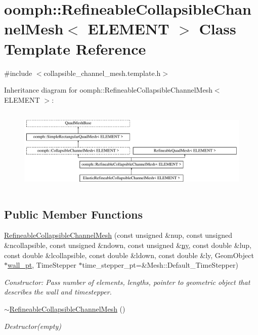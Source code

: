 \hypertarget{classoomph_1_1RefineableCollapsibleChannelMesh}{}\section{oomph\+:\+:Refineable\+Collapsible\+Channel\+Mesh$<$ E\+L\+E\+M\+E\+NT $>$ Class Template Reference}
\label{classoomph_1_1RefineableCollapsibleChannelMesh}


{\ttfamily \#include $<$collapsible\+\_\+channel\+\_\+mesh.\+template.\+h$>$}

Inheritance diagram for oomph\+:\+:Refineable\+Collapsible\+Channel\+Mesh$<$ E\+L\+E\+M\+E\+NT $>$\+:\begin{figure}[H]
\begin{center}
\leavevmode
\includegraphics[height=4.057971cm]{classoomph_1_1RefineableCollapsibleChannelMesh}
\end{center}
\end{figure}
\subsection*{Public Member Functions}
\begin{DoxyCompactItemize}
\item 
\hyperlink{classoomph_1_1RefineableCollapsibleChannelMesh_a0abc3741a7b74dd543096fb303b96243}{Refineable\+Collapsible\+Channel\+Mesh} (const unsigned \&nup, const unsigned \&ncollapsible, const unsigned \&ndown, const unsigned \&\hyperlink{classoomph_1_1SimpleRectangularQuadMesh_a45011f22dedd480392b1f376e4269921}{ny}, const double \&lup, const double \&lcollapsible, const double \&ldown, const double \&ly, Geom\+Object $\ast$\hyperlink{classoomph_1_1CollapsibleChannelMesh_a04ffeb61678763dfd250962ea9ba614b}{wall\+\_\+pt}, Time\+Stepper $\ast$time\+\_\+stepper\+\_\+pt=\&Mesh\+::\+Default\+\_\+\+Time\+Stepper)
\begin{DoxyCompactList}\small\item\em Constructor\+: Pass number of elements, lengths, pointer to geometric object that describes the wall and timestepper. \end{DoxyCompactList}\item 
\hyperlink{classoomph_1_1RefineableCollapsibleChannelMesh_ae429201cc0fe53f5abf96b7d9564df65}{$\sim$\+Refineable\+Collapsible\+Channel\+Mesh} ()
\begin{DoxyCompactList}\small\item\em Destructor(empty) \end{DoxyCompactList}\end{DoxyCompactItemize}
